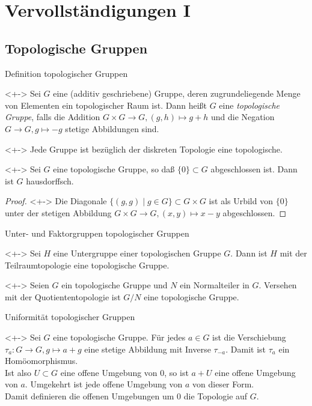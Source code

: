 \section{Vervollständigungen I}

\subsection{Topologische Gruppen}

\begin{frame}{Definition topologischer Gruppen}
	\begin{definition}<+->
		Sei \(G\) eine (additiv geschriebene) Gruppe, deren zugrundeliegende Menge von Elementen
		ein topologischer Raum ist. Dann heißt \(G\) eine \emph{topologische
		Gruppe}, falls die Addition \(G \times G \to G, (g, h) \mapsto g + h\)
		und die Negation \(G \to G, g \mapsto -g\) stetige Abbildungen sind.
	\end{definition}
	\begin{example}<+->
		Jede Gruppe ist bezüglich der diskreten Topologie eine topologische.
	\end{example}
	\begin{proposition}<+->
		Sei \(G\) eine topologische Gruppe, so daß \(\{0\} \subset G\) 
		abgeschlossen ist. Dann ist \(G\) hausdorffsch.
	\end{proposition}
	\begin{proof}<+->
		Die Diagonale \(\{(g, g) \mid g \in G\} \subset G \times G\)
		ist als Urbild von \(\{0\}\) unter der stetigen Abbildung \(G \times G \to G,
		(x, y) \mapsto x - y\) abgeschlossen.
	\end{proof}
\end{frame}

\begin{frame}{Unter- und Faktorgruppen topologischer Gruppen}
	\begin{example}<+->
		Sei \(H\) eine Untergruppe einer topologischen Gruppe \(G\).
		Dann ist \(H\) mit der Teilraumtopologie eine topologische
		Gruppe.
	\end{example}
	\begin{example}<+->
		Seien \(G\) ein topologische Gruppe und \(N\) ein Normalteiler in \(G\).
		Versehen mit der Quotiententopologie ist \(G/N\) eine topologische Gruppe.
	\end{example}
\end{frame}

\begin{frame}{Uniformität topologischer Gruppen}
	\begin{remark}<+->
		Sei \(G\) eine topologische Gruppe. Für jedes \(a \in G\) ist die
		Verschiebung \(\tau_a\colon G \to G, g \mapsto a + g\) eine stetige
		Abbildung mit Inverse \(\tau_{-a}\). Damit ist \(\tau_a\) ein
		Homöomorphismus.
		\\
		Ist also \(U \subset G\) eine offene Umgebung von \(0\), so ist
		\(a + U\) eine offene Umgebung von \(a\). Umgekehrt ist jede
		offene Umgebung von \(a\) von dieser Form.
		\\
		Damit definieren die offenen Umgebungen um \(0\) die Topologie auf \(G\).
	\end{remark}
\end{frame}

